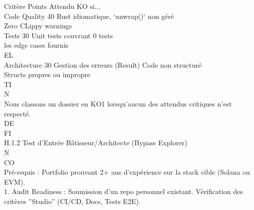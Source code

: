 \documentclass[12pt,landscape,a4paper]{article}
\begin{document}
\vspace{0.5em}
Critère                                        Points         Attendu                                               KO si...\\
Code Quality                                     40           Rust idiomatique,                                     ‘unwrap()‘ non géré\\
Zero CLippy warnings\\
Tests                                            30           Unit tests couvrant                                   0 tests\\
les edge cases                                        fournis\\
\vspace{0.5em}
\vspace{0.5em}
\vspace{0.5em}
\vspace{0.5em}
EL\\
Architecture                                     30           Gestion des erreurs (Result)                          Code non structuré\\
Structs propres                                       ou impropre\\
\vspace{0.5em}
\vspace{0.5em}
\vspace{0.5em}
\vspace{0.5em}
TI\\
N\\
Nous classons un dossier en KO1 lorsqu’aucun des attendus critiques n’est respecté.\\
\vspace{0.5em}
\vspace{0.5em}
\vspace{0.5em}
\vspace{0.5em}
DE\\
FI\\
H.1.2 Test d’Entrée Bâtisseur/Architecte (Bypass Explorer)\\
\vspace{0.5em}
\vspace{0.5em}
N\\
CO\\
Pré-requis : Portfolio prouvant 2+ ans d’expérience sur la stack cible (Solana ou EVM).\\
\vspace{0.5em}
1. Audit Readiness : Soumission d’un repo personnel existant. Vérification des critères ”Studio” (CI/CD, Docs, Tests E2E).\\
\end{document}
